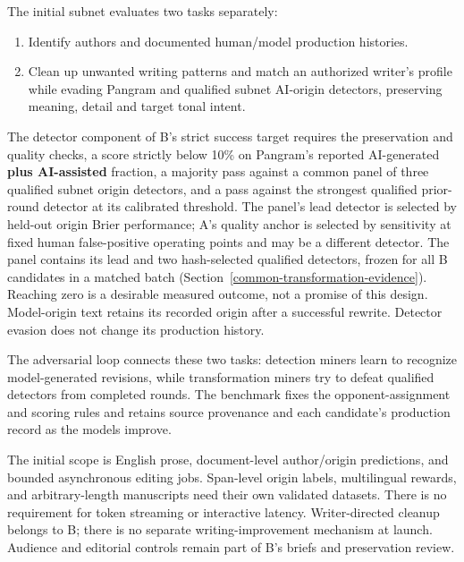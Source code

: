 The initial subnet evaluates two tasks separately:

\begin{enumerate}
\def\labelenumi{\Alph{enumi}.}
\tightlist
\item
  Identify authors and documented human/model production histories.
\item
  Clean up unwanted writing patterns and match an authorized writer's
  profile while evading Pangram and qualified subnet AI-origin detectors,
  preserving meaning, detail and target tonal intent.
\end{enumerate}

The detector component of B's strict success target requires the
preservation and quality checks, a score strictly below 10\% on
Pangram's reported AI-generated \textbf{plus AI-assisted} fraction,
a majority pass against a common panel of three qualified subnet origin
detectors, and a pass against the strongest qualified prior-round detector at its
calibrated threshold. The panel's lead detector is selected by held-out
origin Brier performance; A's quality anchor is selected by sensitivity at
fixed human false-positive operating points and may be a different detector.
The panel contains its lead and two hash-selected qualified detectors,
frozen for all B candidates in a matched batch
(Section~\ref{common-transformation-evidence}). Reaching zero is a
desirable measured outcome, not a promise
of this design. Model-origin text retains its recorded origin after a
successful rewrite. Detector evasion does not change its production
history.

The adversarial loop connects these two tasks: detection miners
learn to recognize model-generated revisions, while transformation
miners try to defeat qualified detectors from completed rounds.
The benchmark fixes the opponent-assignment and scoring rules and retains
source provenance and each candidate's production record as the models improve.

The initial scope is English prose, document-level author/origin
predictions, and bounded asynchronous editing jobs. Span-level origin
labels, multilingual rewards, and arbitrary-length manuscripts need
their own validated datasets. There is no requirement for token
streaming or interactive latency. Writer-directed cleanup belongs to B;
there is no separate writing-improvement mechanism at launch. Audience
and editorial controls remain part of B's briefs and preservation review.
